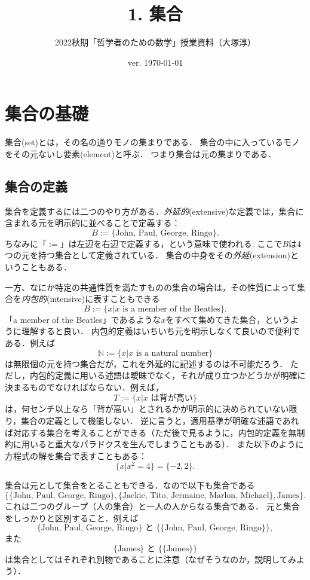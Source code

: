 \documentclass[11pt,a4paper]{jsarticle}
\begin{document}
\title{1. 集合}
\author{2022秋期「哲学者のための数学」授業資料（大塚淳）}
\date{ver. \today}
\maketitle

\section{集合の基礎}
集合(set)とは，その名の通りモノの集まりである．
集合の中に入っているモノをその元ないし要素(element)と呼ぶ．
つまり集合は元の集まりである．




\subsection{集合の定義}

集合を定義するには二つのやり方がある．\emph{外延的}(extensive)な定義では，集合に含まれる元を明示的に並べることで定義する：
\[
 B := \{\text{John, Paul, George, Ringo}\}.
\]
ちなみに「$:=$」は左辺を右辺で定義する，という意味で使われる.
ここで$B$は4つの元を持つ集合として定義されている．
集合の中身をその\emph{外延}(extension)ということもある．

一方、なにか特定の共通性質を満たすものの集合の場合は，その性質によって集合を\emph{内包的}(intensive)に表すこともできる
\[
 B := \{x | x \text{ is a member of the Beatles}\}.
\]
「a member of the Beatles」であるような$x$をすべて集めてきた集合，というように理解すると良い．
内包的定義はいちいち元を明示しなくて良いので便利である．例えば
\[
 \mathbb{N} := \{x | x \text{ is a natural number}\}
\]
は無限個の元を持つ集合だが，これを外延的に記述するのは不可能だろう．
ただし，内包的定義に用いる述語は曖昧でなく，それが成り立つかどうかが明確に決まるものでなければならない．例えば，
\[
 T := \{x | x \text{ は背が高い}\}
\]
は，何センチ以上なら「背が高い」とされるかが明示的に決められていない限り，集合の定義として機能しない．
逆に言うと，適用基準が明確な述語であれば対応する集合を考えることができる（ただ後で見るように，内包的定義を無制約に用いると重大なパラドクスを生んでしまうこともある）．
また以下のように方程式の解を集合で表すこともある：
\[
 \{ x | x^2 = 4\} = \{ -2, 2 \}.
\]


集合は元として集合をとることもできる．なので以下も集合である
\[
\{ \{\text{John, Paul, George, Ringo}\}, \{ \text{Jackie, Tito, Jermaine, Marlon, Michael}\}, \text{James} \}.
\]
これは二つのグループ（人の集合）と一人の人からなる集合である．
元と集合をしっかりと区別すること．例えば
\[
\{\text{John, Paul, George, Ringo}\} \text{ と } \{ \{\text{John, Paul, George, Ringo}\} \},
\]
また
\[
\{\text{James}\} \text{ と } \{ \{\text{James}\} \}  
\]
は集合としてはそれぞれ別物であることに注意（なぜそうなのか，説明してみよう）．
\end{document}
